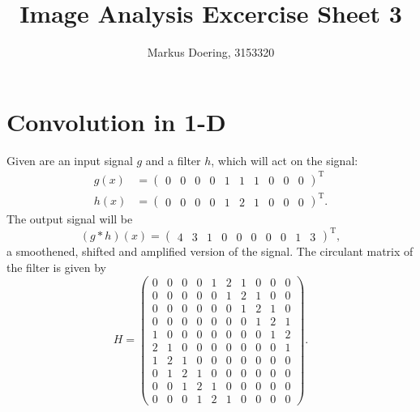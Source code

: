 \documentclass[11pt]{scrartcl}
\newcommand{\T}{\mathrm{T}}
\newcommand{\conv}{\ast}
\begin{document}
\title{Image Analysis Excercise Sheet 3}
\author{Markus Doering, 3153320}
\maketitle

\section{Convolution in 1-D}
Given are an input signal $g$ and a filter $h$, which will act on the signal: 
%
\begin{align*}
g(x) &= \begin{pmatrix}0  & 0  & 0  & 0  & 1  & 1  & 1  & 0  & 0  & 0 \end{pmatrix}^\T \\
h(x) &= \begin{pmatrix}0  & 0  & 0  & 0  & 1  & 2  & 1  & 0  & 0  & 0 \end{pmatrix}^\T. 
\end{align*}
%
The output signal will be 
%
\begin{equation*}
(g\conv h)(x) = \begin{pmatrix}4  & 3  & 1  & 0  & 0  & 0  & 0  & 0  & 1  & 3 \end{pmatrix}^\T,
\end{equation*}
%
a smoothened, shifted and amplified version of the signal. The circulant matrix of the filter is given by 
%
\begin{equation*}
H = %
 \begin{pmatrix}
  0  & 0  & 0  & 0  & 1  & 2  & 1  & 0  & 0  & 0  \\
  0  & 0  & 0  & 0  & 0  & 1  & 2  & 1  & 0  & 0  \\
  0  & 0  & 0  & 0  & 0  & 0  & 1  & 2  & 1  & 0  \\
  0  & 0  & 0  & 0  & 0  & 0  & 0  & 1  & 2  & 1  \\
  1  & 0  & 0  & 0  & 0  & 0  & 0  & 0  & 1  & 2  \\
  2  & 1  & 0  & 0  & 0  & 0  & 0  & 0  & 0  & 1  \\
  1  & 2  & 1  & 0  & 0  & 0  & 0  & 0  & 0  & 0  \\ 
  0  & 1  & 2  & 1  & 0  & 0  & 0  & 0  & 0  & 0  \\
  0  & 0  & 1  & 2  & 1  & 0  & 0  & 0  & 0  & 0  \\
  0  & 0  & 0  & 1  & 2  & 1  & 0  & 0  & 0  & 0
 \end{pmatrix}.
\end{equation*}
%
\end{document}
